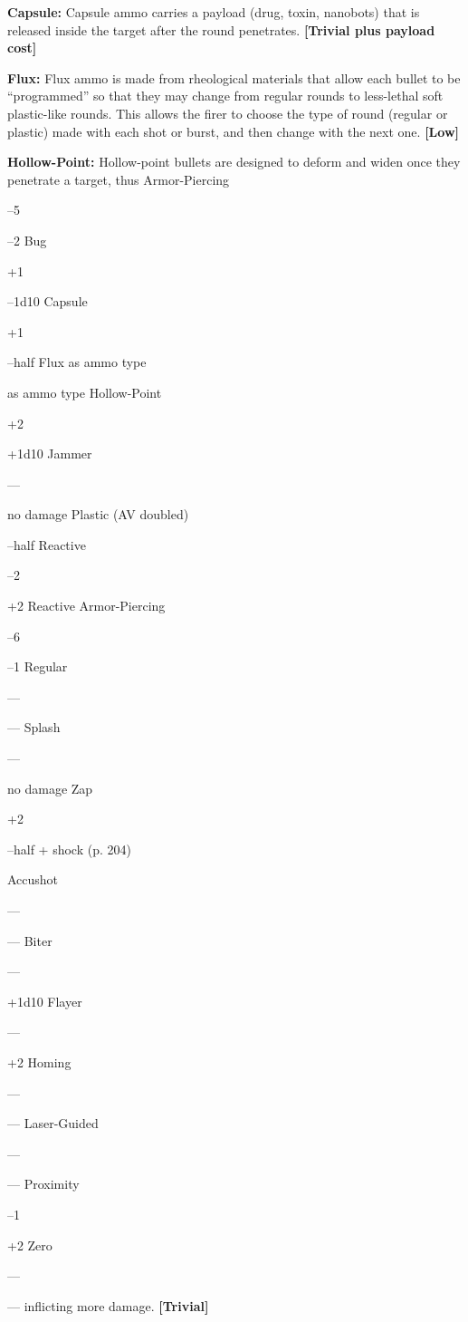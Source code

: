 \textbf{Capsule:} Capsule ammo carries a payload (drug, 
toxin, nanobots) that is released inside the target after 
the round penetrates. \textbf{[Trivial plus payload cost]}

\textbf{Flux:} Flux ammo is made from rheological materials
that allow each bullet to be ``programmed'' so that
they may change from regular rounds to less-lethal soft 
plastic-like rounds. This allows the firer to choose the 
type of round (regular or plastic) made with each shot 
or burst, and then change with the next one. \textbf{[Low]}

\textbf{Hollow-Point:} Hollow-point bullets are designed to 
deform and widen once they penetrate a target, thus 
Armor-Piercing

–5

–2
Bug

+1

–1d10
Capsule

+1

–half
Flux
as ammo type

as ammo type
Hollow-Point

+2

+1d10
Jammer

—

no damage
Plastic
(AV doubled)

–half
Reactive

–2

+2
Reactive Armor-Piercing


–6

–1
Regular

—

—
Splash

—

no damage
Zap

+2

–half + shock (p. 204)
 
Accushot

—

—
Biter

—

+1d10
Flayer

—

+2
Homing

—

—
Laser-Guided

—

—
Proximity

–1

+2
Zero

—

—
inflicting more damage. \textbf{[Trivial]}

